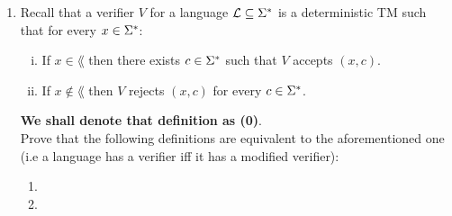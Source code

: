 \documentclass{article}
\begin{document}
\begin{enumerate}
          \pagebreak

    \item Recall that a verifier $V$ for a language $\mathcal{L} \subseteq \Sigma^*$ is a deterministic TM such
          that for every $x \in \Sigma^*$:
          \begin{enumerate}[(i)]
              \item If $x \in \lang$ then there exists $c \in \Sigma^*$ such that $V$ accepts $(x, c)$.
              \item If $x \notin \lang$ then $V$ rejects $(x, c)$ for every $c \in \Sigma^*$.
          \end{enumerate}
          \textbf{We shall denote that definition as (0)}.  \\
          Prove that the following definitions are equivalent to the aforementioned one
          (i.e a language has a verifier iff it has a modified verifier):

          \begin{enumerate}
              \item 
              \item 
          \end{enumerate}
          \pagebreak

\end{enumerate}
\end{document}
